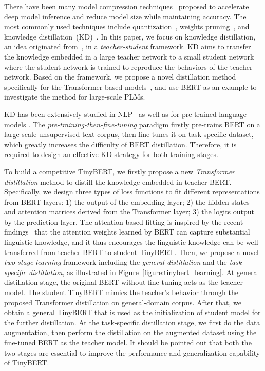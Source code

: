 \documentclass[11pt,a4paper]{article}
\begin{document}
There have been many model compression techniques~\cite{han2015deep} proposed to accelerate deep model inference and reduce model size while maintaining accuracy. The most commonly used techniques include quantization~\cite{gong2014compressing}, weights pruning~\cite{han2015learning}, and knowledge distillation~(KD)~\cite{romero2014fitnets}. In this paper, we focus on knowledge distillation, an idea originated from~\citet{hinton2015distilling}, in a {\it teacher-student} framework. KD aims to transfer the knowledge embedded in a large teacher network to a small student network where the student network is trained to reproduce the behaviors of the teacher network. Based on the framework, we propose a novel distillation method specifically for the Transformer-based models~\cite{vaswani2017attention}, and use BERT as an example to investigate the method for large-scale PLMs. 

KD has been extensively studied in NLP~\cite{kim2016sequence,hu2018attention} as well as for pre-trained language models \cite{sanh2019distilbert,sun2019patient,sun2020mobilebert,wang2020minilm}. The {\it pre-training-then-fine-tuning} paradigm firstly pre-trains BERT on a large-scale unsupervised text corpus, then fine-tunes it on task-specific dataset, which greatly increases the difficulty of BERT distillation. Therefore, it is required to design an effective KD strategy for both training stages.

To build a competitive TinyBERT, we firstly propose a new {\it Transformer distillation} method to distill the knowledge embedded in teacher BERT. Specifically, we design three types of loss functions to fit different representations from BERT layers: 1) the output of the embedding layer; 2) the hidden states and attention matrices derived from the Transformer layer; 3) the logits output by the prediction layer. The attention based fitting is inspired by the recent findings~\cite{clark2019does} that the attention weights learned by BERT can capture substantial linguistic knowledge, and it thus encourages the linguistic knowledge can be well transferred from teacher BERT to student TinyBERT. Then, we propose a novel {\it two-stage learning} framework including the {\it general distillation} and the {\it task-specific distillation}, as illustrated
in Figure~\ref{figure:tinybert_learning}. At general distillation stage, the original BERT without fine-tuning acts as the teacher model. The student TinyBERT mimics the teacher's behavior through the proposed Transformer distillation on general-domain corpus. After that, we obtain a general TinyBERT that is used as the initialization of student model for the further distillation. At the task-specific distillation stage, we first do the data augmentation, then perform the distillation on the augmented dataset using the fine-tuned BERT as the teacher model. It should be pointed out that both the two stages are essential to improve the performance and generalization capability of TinyBERT. 
\end{document}
